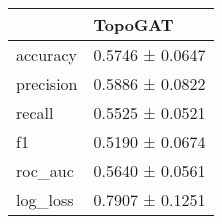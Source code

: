\begin{tabular}{ll}
\toprule
 & TopoGAT \\
\midrule
accuracy & 0.5746 ± 0.0647 \\
precision & 0.5886 ± 0.0822 \\
recall & 0.5525 ± 0.0521 \\
f1 & 0.5190 ± 0.0674 \\
roc_auc & 0.5640 ± 0.0561 \\
log_loss & 0.7907 ± 0.1251 \\
\bottomrule
\end{tabular}
